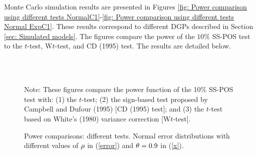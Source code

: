 \documentclass[harvard,11pt]{article}
\begin{document}
Monte Carlo simulation results are presented in Figures \ref{fig: Power
comparison using different tests NormalC1}-\ref{fig: Power comparison using different tests Normal ExpC1}. These results correspond to different DGPs
described in Section \ref{sec: Simulated models}. The figures compare the
power of the $10\%$ SS-POS test to the $t$-test, W$t$-test, and CD (1995) test. The results are detailed below. 
\begin{figure}[tbph]
\caption{Power comparisons: different tests. Normal error distributions with
different values of $\protect\rho $ in (\protect\ref{error}) and $\protect%
\theta =0.9$ in (\protect\ref{x}).}
\begin{center}
 \\[0pt]
\\[0pt]
\end{center}

Note: These figures compare the power
function of the 10\% SS-POS test with: (1) the $t$-test; (2) the sign-based test
proposed by Campbell and Dufour (1995) [CD (1995) test]; and (3) the $t$-test based
on White's (1980) variance correction [W$t$-test]. 
\label{fig: Power comparison using different tests NormalC1}
\end{figure}
\end{document}
